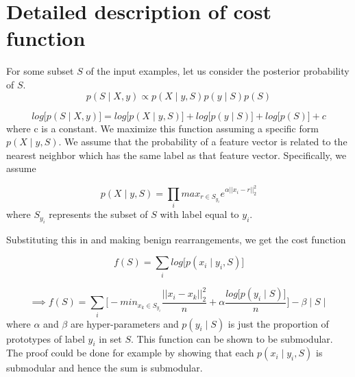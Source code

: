 \documentclass[11pt]{article}
\begin{document}
\section{Detailed description of cost function}

For some subset $S$ of the input examples, let us consider the posterior probability of $S$. 
\begin{equation}
p(S \mid X,y) \propto p(X \mid y,S) p(y \mid S) p(S)
\end{equation}

\begin{equation}
log\big\lbrack p(S \mid X,y) \big\rbrack = log\big\lbrack p(X \mid y,S)\big\rbrack + log \big\lbrack p(y \mid S) \big\rbrack+log \big\lbrack p(S) \big\rbrack+ c
\end{equation}
where c is a constant. We maximize this function assuming a specific form $p(X \mid y,S)$. We assume that the probability of a feature vector is related to the nearest neighbor which has the same label as that feature vector. Specifically, we assume

\begin{equation}
p(X \mid y,S) = \prod_{i} max_{r\in S_{y_{i}}}e^{\alpha ||x_{i} - r||_{2}^2}
\end{equation}
where $S_{y_{i}}$ represents the subset of $S$ with label equal to $y_{i}$. 

Substituting this in and making benign rearrangements, we get the cost function

\begin{equation}
f(S) = \sum_{i} log  \big\lbrack p(x_{i} \mid y_{i},S)\big\rbrack
\end{equation}

\begin{equation*}
\implies f(S) = \sum_{i} \bigg\lbrack -min_{x_{k} \in S_{y_{i}}} \frac{||x_{i} - x_{k}||_{2}^{2}}{n} + \alpha \frac{log \big\lbrack p(y_{i} \mid S) \big\rbrack }{n} \bigg\rbrack -\beta \mid S\mid
\end{equation*}
where $\alpha$ and $\beta$ are hyper-parameters and $p(y_{i} \mid S)$ is just the proportion of prototypes of label $y_{i}$ in set $S$. This function can be shown to be submodular. The proof could be done for example by showing that each $p(x_{i} \mid y_{i},S)$ is submodular and hence the sum is submodular. 
 
\end{document}
